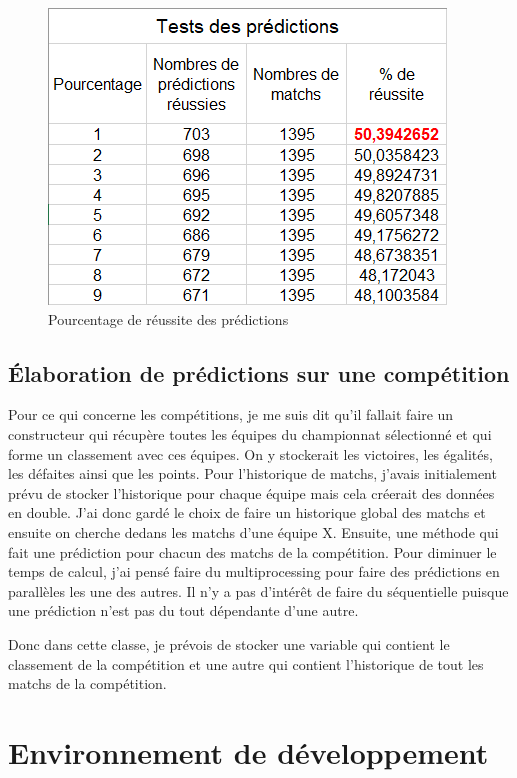 \documentclass[a4paper,14pt]{extarticle}
\begin{document}
{\begin{figure}[htp]
    \centering
    \includegraphics{../img/pourcentReussitePredictionV3.png}
    \caption{Pourcentage de réussite des prédictions}
    \label{fig:pourcentReussite}
\end{figure}

\subsection{Élaboration de prédictions sur une compétition}
\label{predictionCompetition}
Pour ce qui concerne les compétitions, je me suis dit qu'il fallait faire un constructeur qui récupère toutes les équipes du championnat sélectionné et qui forme un classement avec ces équipes. On y stockerait les victoires, les égalités, les défaites ainsi que les points. Pour l'historique de matchs, j'avais initialement prévu de stocker l'historique pour chaque équipe mais cela créerait des données en double. J'ai donc gardé le choix de faire un historique global des matchs et ensuite on cherche dedans les matchs d'une équipe X. 
Ensuite, une méthode qui fait une prédiction pour chacun des matchs de la compétition. Pour diminuer le temps de calcul, j'ai pensé faire du multiprocessing pour faire des prédictions en parallèles les une des autres. Il n'y a pas d'intérêt de faire du séquentielle puisque une prédiction n'est pas du tout dépendante d'une autre.

Donc dans cette classe, je prévois de stocker une variable qui contient le classement de la compétition et une autre qui contient l'historique de tout les matchs de la compétition.

\newpage

\section{Environnement de développement}

}
\end{document}
